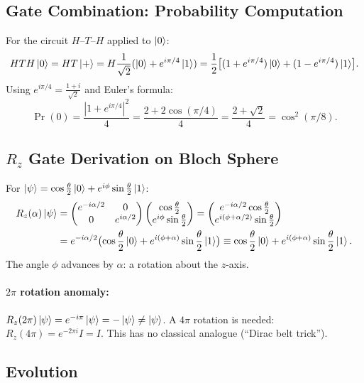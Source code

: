\documentclass[10pt,a4paper]{article}
\begin{document}
\subsection{Gate Combination: Probability Computation}

For the circuit $H$--$T$--$H$ applied to $\ket{0}$:
\[
HTH\ket{0}=HT\ket{+}=H\frac{1}{\sqrt{2}}(\ket{0}+e^{i\pi/4}\ket{1})=\frac{1}{2}\bigl[(1+e^{i\pi/4})\ket{0}+(1-e^{i\pi/4})\ket{1}\bigr].
\]
Using $e^{i\pi/4}=\frac{1+i}{\sqrt{2}}$ and Euler's formula:
\[
\Pr(0)=\frac{|1+e^{i\pi/4}|^2}{4}=\frac{2+2\cos(\pi/4)}{4}=\frac{2+\sqrt{2}}{4}=\cos^2(\pi/8).
\]

\subsection{$R_z$ Gate Derivation on Bloch Sphere}

For $\ket{\psi}=\cos\frac{\theta}{2}\ket{0}+e^{i\phi}\sin\frac{\theta}{2}\ket{1}$:
\begin{align*}
R_z(\alpha)\ket{\psi}&=\begin{pmatrix}e^{-i\alpha/2}&0\\0&e^{i\alpha/2}\end{pmatrix}\begin{pmatrix}\cos\frac{\theta}{2}\\e^{i\phi}\sin\frac{\theta}{2}\end{pmatrix}=\begin{pmatrix}e^{-i\alpha/2}\cos\frac{\theta}{2}\\e^{i(\phi+\alpha/2)}\sin\frac{\theta}{2}\end{pmatrix}\\
&=e^{-i\alpha/2}\bigl(\cos\frac{\theta}{2}\ket{0}+e^{i(\phi+\alpha)}\sin\frac{\theta}{2}\ket{1}\bigr)\equiv\cos\frac{\theta}{2}\ket{0}+e^{i(\phi+\alpha)}\sin\frac{\theta}{2}\ket{1}.
\end{align*}
The angle $\phi$ advances by $\alpha$: a rotation about the $z$-axis.

\paragraph{$2\pi$ rotation anomaly:} $R_z(2\pi)\ket{\psi}=e^{-i\pi}\ket{\psi}=-\ket{\psi}\neq\ket{\psi}$. A $4\pi$ rotation is needed: $R_z(4\pi)=e^{-2\pi i}I=I$. This has no classical analogue (``Dirac belt trick'').

\subsection{Evolution}
\end{document}
